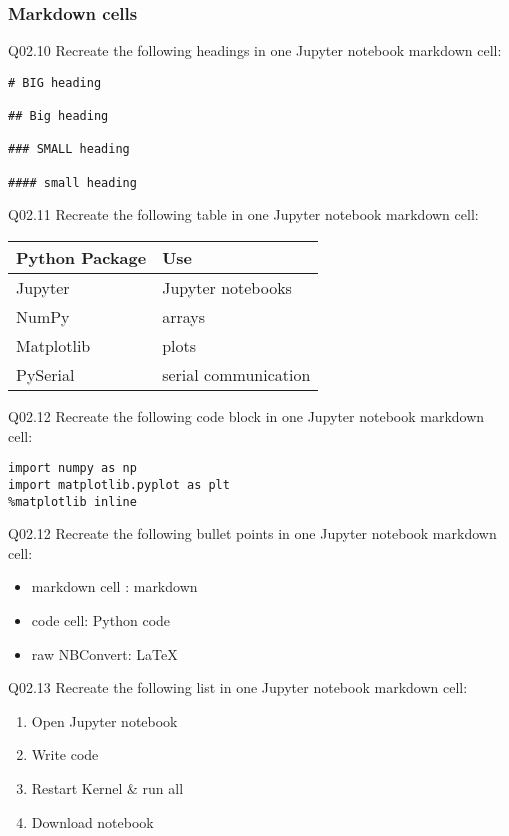 \documentclass{book}
\newenvironment{problems}{}{}  %
\providecommand{\tightlist}{%
      \setlength{\itemsep}{0pt}\setlength{\parskip}{0pt}}
\begin{document}
    
        \begin{problems}
        \hypertarget{markdown-cells}{%
\subsubsection{Markdown cells}\label{markdown-cells}}

Q02.10 Recreate the following headings in one Jupyter notebook markdown
cell:

\begin{lstlisting}
# BIG heading

## Big heading

### SMALL heading

#### small heading
\end{lstlisting}

Q02.11 Recreate the following table in one Jupyter notebook markdown
cell:

\begin{longtable}[]{@{}ll@{}}
\toprule
Python Package & Use\tabularnewline
\midrule
\endhead
Jupyter & Jupyter notebooks\tabularnewline
NumPy & arrays\tabularnewline
Matplotlib & plots\tabularnewline
PySerial & serial communication\tabularnewline
\bottomrule
\end{longtable}

Q02.12 Recreate the following code block in one Jupyter notebook
markdown cell:

\begin{lstlisting}
import numpy as np
import matplotlib.pyplot as plt
%matplotlib inline
\end{lstlisting}

Q02.12 Recreate the following bullet points in one Jupyter notebook
markdown cell:

\begin{itemize}
\tightlist
\item
  markdown cell : markdown
\item
  code cell: Python code
\item
  raw NBConvert: LaTeX
\end{itemize}

Q02.13 Recreate the following list in one Jupyter notebook markdown
cell:

\begin{enumerate}
\def\labelenumi{\arabic{enumi}.}
\tightlist
\item
  Open Jupyter notebook
\item
  Write code
\item
  Restart Kernel \& run all
\item
  Download notebook
\end{enumerate}


\end{problems}
\end{document}
